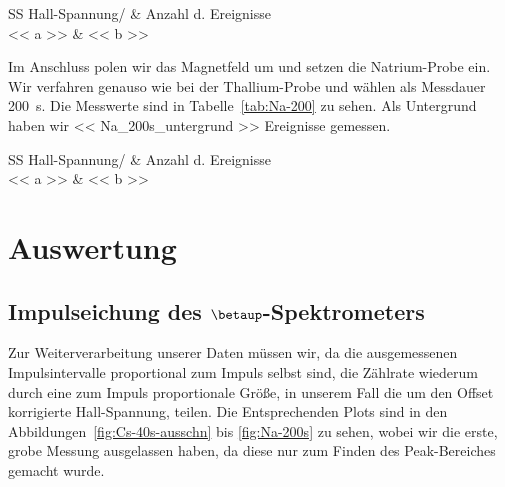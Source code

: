 \documentclass[11pt, ngerman, fleqn, DIV=15, headinclude, BCOR=2cm]{scrreprt}
\begin{document}
\begin{table}[htbp]
    \centering
    \begin{tabular}{SS}
        {Hall-Spannung/\si{\skt}} & {Anzahl d. Ereignisse} \\
        \midrule
        << a >> & << b >> \\
    \end{tabular}
    \caption{%
        Messwerte zur Bestimmung des $\betaup$-Spektrums. Probe: ${}^{204}$Tl,
        Zeit: \SI{80}{\second}, Transmission: \SI{4}{\percent}.
    }
    \label{tab:Tl-80}
\end{table}

Im Anschluss polen wir das Magnetfeld um und setzen die Natrium-Probe ein. Wir
verfahren genauso wie bei der Thallium-Probe und wählen als Messdauer
\SI{200}{\second}. Die Messwerte sind in Tabelle~\ref{tab:Na-200} zu sehen. Als
Untergrund haben wir \num{<< Na_200s_untergrund >>} Ereignisse gemessen.

\begin{table}[htbp]
    \centering
    \begin{tabular}{SS}
        {Hall-Spannung/\si{\skt}} & {Anzahl d. Ereignisse} \\
        \midrule
        << a >> & << b >> \\
    \end{tabular}
    \caption{%
        Messwerte zur Bestimmung des $\betaup$-Spektrums. Probe: ${}^{22}$Na,
        Zeit: \SI{200}{\second}, Transmission: \SI{4}{\percent}.
    }
    \label{tab:Na-200}
\end{table}

\chapter{Auswertung}

\section{Impulseichung des $\betaup$-Spektrometers}

Zur Weiterverarbeitung unserer Daten müssen wir, da die
ausgemessenen Impulsintervalle proportional zum Impuls selbst sind, die
Zählrate wiederum durch eine zum Impuls proportionale Größe, in unserem Fall
die um den Offset korrigierte Hall-Spannung, teilen. Die Entsprechenden Plots
sind in den Abbildungen~\ref{fig:Cs-40s-ausschn} bis \ref{fig:Na-200s} zu sehen,
wobei wir die erste, grobe Messung ausgelassen haben, da diese nur zum Finden
des Peak-Bereiches gemacht wurde.
\end{document}
